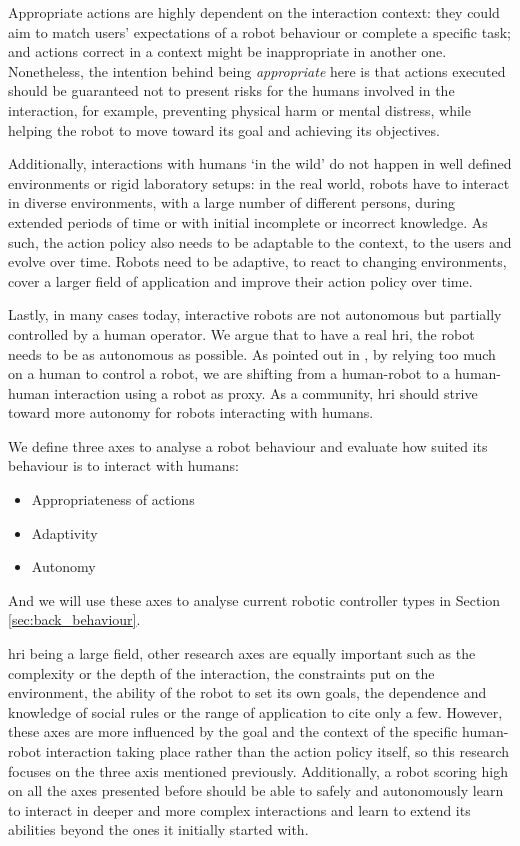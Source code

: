     Appropriate actions are highly dependent on the interaction context: they could aim to match users' expectations of a robot behaviour or complete a specific task; and actions correct in a context might be inappropriate in another one. Nonetheless, the intention behind being \textit{appropriate} here is that actions executed should be guaranteed not to present risks for the humans involved in the interaction, for example, preventing physical harm or mental distress, while helping the robot to move toward its goal and achieving its objectives.

    Additionally, interactions with humans `in the wild' \citep{belpaeme2012multimodal} do not happen in well defined environments or rigid laboratory setups: in the real world, robots have to interact in diverse environments, with a large number of different persons, during extended periods of time or with initial incomplete or incorrect knowledge. As such, the action policy also needs to be adaptable to the context, to the users and evolve over time. Robots need to be adaptive, to react to changing environments, cover a larger field of application and improve their action policy over time.

    Lastly, in many cases today, interactive robots are not autonomous but partially controlled by a human operator. We argue that to have a real \acrlong{hri}, the robot needs to be as autonomous as possible. As pointed out in \citet{baxter2016characterising}, by relying too much on a human to control a robot, we are shifting from a human-robot to a human-human interaction using a robot as proxy. As a community, \gls{hri} should strive toward more autonomy for robots interacting with humans.
    
    We define three axes to analyse a robot behaviour and evaluate how suited its behaviour is to interact with humans:
    \begin{itemize}
    	\item Appropriateness of actions
    	\item Adaptivity
    	\item Autonomy
    \end{itemize}
    And we will use these axes to analyse current robotic controller types in Section \ref{sec:back_behaviour}.    
    
    \gls{hri} being a large field, other research axes are equally important such as the complexity or the depth of the interaction, the constraints put on the environment, the ability of the robot to set its own goals, the dependence and knowledge of social rules or the range of application to cite only a few. However, these axes are more influenced by the goal and the context of the specific human-robot interaction taking place rather than the action policy itself, so this research focuses on the three axis mentioned previously. Additionally, a robot scoring high on all the axes presented before should be able to safely and autonomously learn to interact in deeper and more complex interactions and learn to extend its abilities beyond the ones it initially started with.

